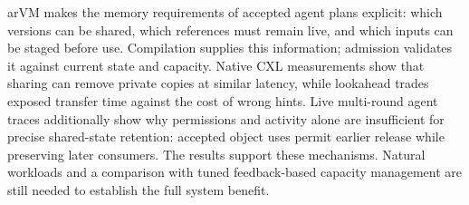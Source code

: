 \documentclass[letterpaper,twocolumn,10pt]{article}
\newcommand{\arvm}{arVM\xspace}
\begin{document}
\arvm makes the memory requirements of accepted agent plans explicit:
which versions can be shared, which references must remain live, and which
inputs can be staged before use. Compilation supplies this information;
admission validates it against current state and capacity. Native CXL
measurements show that sharing can remove private copies at similar latency,
while lookahead trades exposed transfer time against the cost of wrong hints.
Live multi-round agent traces additionally show why permissions and activity
alone are insufficient for precise shared-state retention: accepted object
uses permit earlier release while preserving later consumers. The results
support these mechanisms. Natural workloads and a comparison with tuned
feedback-based capacity management are still needed to establish the full
system benefit.

\clearpage
\label{page:references}


\end{document}
